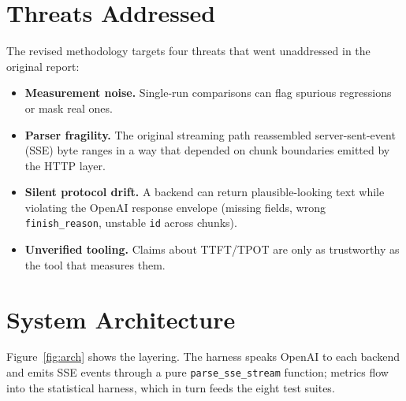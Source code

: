 \documentclass[sigconf,nonacm]{acmart}
\begin{document}
\section{Threats Addressed}
The revised methodology targets four threats that went unaddressed in the
original report:
\begin{itemize}
  \item \textbf{Measurement noise.} Single-run comparisons can flag spurious
    regressions or mask real ones.
  \item \textbf{Parser fragility.} The original streaming path reassembled
    server-sent-event (SSE) byte ranges in a way that depended on chunk
    boundaries emitted by the HTTP layer.
  \item \textbf{Silent protocol drift.} A backend can return plausible-looking
    text while violating the OpenAI response envelope (missing fields, wrong
    \texttt{finish\_reason}, unstable \texttt{id} across chunks).
  \item \textbf{Unverified tooling.} Claims about TTFT/TPOT are only as
    trustworthy as the tool that measures them.
\end{itemize}

\section{System Architecture}
Figure~\ref{fig:arch} shows the layering. The harness speaks OpenAI to each
backend and emits SSE events through a pure \texttt{parse\_sse\_stream}
function; metrics flow into the statistical harness, which in turn feeds
the eight test suites.
\end{document}
